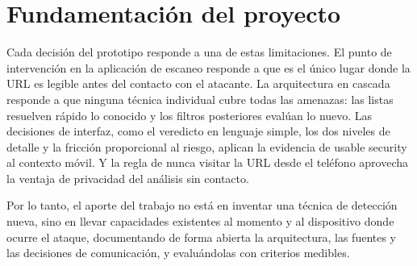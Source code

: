 \section{Fundamentación del proyecto}

Cada decisión del prototipo responde a una de estas limitaciones. El punto de intervención en la aplicación de escaneo responde a que es el único lugar donde la URL es legible antes del contacto con el atacante. La arquitectura en cascada responde a que ninguna técnica individual cubre todas las amenazas: las listas resuelven rápido lo conocido y los filtros posteriores evalúan lo nuevo. Las decisiones de interfaz, como el veredicto en lenguaje simple, los dos niveles de detalle y la fricción proporcional al riesgo, aplican la evidencia de usable security al contexto móvil. Y la regla de nunca visitar la URL desde el teléfono aprovecha la ventaja de privacidad del análisis sin contacto.

Por lo tanto, el aporte del trabajo no está en inventar una técnica de detección nueva, sino en llevar capacidades existentes al momento y al dispositivo donde ocurre el ataque, documentando de forma abierta la arquitectura, las fuentes y las decisiones de comunicación, y evaluándolas con criterios medibles.
